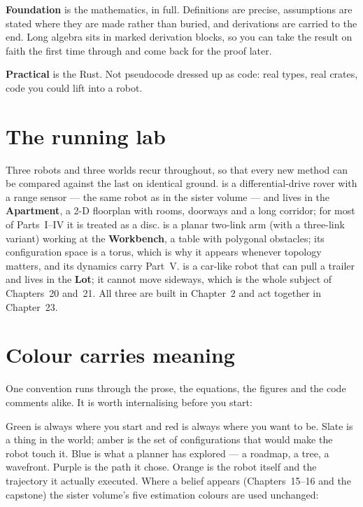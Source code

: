 \documentclass[11pt, twoside, openright]{book}
\begin{document}
\textbf{Foundation} is the mathematics, in full. Definitions are precise,
assumptions are stated where they are made rather than buried, and derivations
are carried to the end. Long algebra sits in marked derivation blocks, so you
can take the result on faith the first time through and come back for the proof
later.

\textbf{Practical} is the Rust. Not pseudocode dressed up as code: real types,
real crates, code you could lift into a robot.

\section*{The running lab}

Three robots and three worlds recur throughout, so that every new method can be
compared against the last on identical ground.  is a
differential-drive rover with a range sensor --- the same robot as in the sister
volume --- and lives in the \textbf{Apartment}, a 2-D floorplan with rooms,
doorways and a long corridor; for most of Parts~I--IV it is treated as a disc.
 is a planar two-link arm (with a three-link variant) working
at the \textbf{Workbench}, a table with polygonal obstacles; its configuration
space is a torus, which is why it appears whenever topology matters, and its
dynamics carry Part~V.  is a car-like robot that can pull a
trailer and lives in the \textbf{Lot}; it cannot move sideways, which is the
whole subject of Chapters~20 and~21. All three are built in Chapter~2 and act
together in Chapter~23.

\section*{Colour carries meaning}

One convention runs through the prose, the equations, the figures and the code
comments alike. It is worth internalising before you start:

\shplanningkey

\noindent
Green is always where you start and red is always where you want to be. Slate is
a thing in the world; amber is the set of configurations that would make the
robot touch it. Blue is what a planner has explored --- a roadmap, a tree, a
wavefront. Purple is the path it chose. Orange is the robot itself and the
trajectory it actually executed. Where a belief appears (Chapters~15--16 and the
capstone) the sister volume's five estimation colours are used unchanged:
\end{document}
